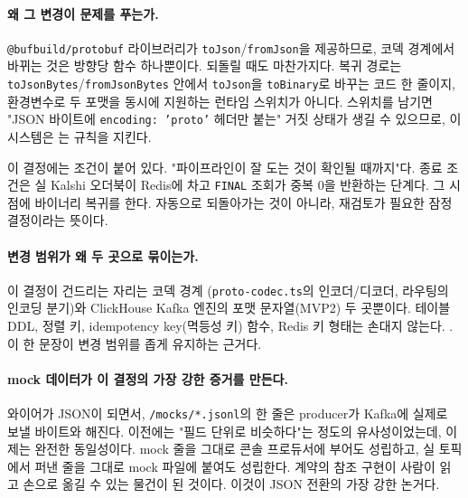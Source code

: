 \paragraph{왜 그 변경이 문제를 푸는가.} \texttt{@bufbuild/protobuf} 라이브러리가
\texttt{toJson}/\texttt{fromJson}을 제공하므로, 코덱 경계에서 바뀌는 것은 방향당
함수 하나뿐이다.  되돌릴 때도 마찬가지다. 복귀 경로는 \texttt{toJsonBytes}/\texttt{fromJsonBytes} 안에서 \texttt{toJson}을
\texttt{toBinary}로 바꾸는 코드 한 줄이지, 환경변수로 두 포맷을 동시에 지원하는
런타임 스위치가 아니다. 스위치를 남기면 "JSON 바이트에 \texttt{encoding: 'proto'}
헤더만 붙는" 거짓 상태가 생길 수 있으므로, 이 시스템은 는 규칙을 지킨다.

\begin{callout}
이 결정에는 조건이 붙어 있다. "파이프라인이 잘 도는 것이 확인될 때까지"다. 종료
조건은 실 Kalshi 오더북이 Redis에 차고 \texttt{FINAL} 조회가 중복 0을 반환하는
단계다. 그 시점에 바이너리 복귀를 한다. 자동으로 되돌아가는 것이
아니라, 재검토가 필요한 잠정 결정이라는 뜻이다.
\end{callout}

\paragraph{변경 범위가 왜 두 곳으로 묶이는가.} 이 결정이 건드리는 자리는 코덱 경계
(\texttt{proto-codec.ts}의 인코더/디코더, 라우팅의 인코딩 분기)와 ClickHouse Kafka
엔진의 포맷 문자열(MVP2) 두 곳뿐이다. 테이블 DDL, 정렬 키, idempotency key(멱등성
키) 함수, Redis 키 형태는 손대지 않는다. . 이 한 문장이 변경 범위를 좁게 유지하는 근거다.

\paragraph{mock 데이터가 이 결정의 가장 강한 증거를 만든다.} 와이어가 JSON이
되면서, \texttt{/mocks/*.jsonl}의 한 줄은 producer가 Kafka에 실제로 보낼 바이트와
해진다. 이전에는 "필드 단위로 비슷하다"는 정도의 유사성이었는데,
이제는 완전한 동일성이다. mock 줄을 그대로 콘솔 프로듀서에 부어도 성립하고, 실
토픽에서 퍼낸 줄을 그대로 mock 파일에 붙여도 성립한다. 계약의 참조 구현이 사람이
읽고 손으로 옮길 수 있는 물건이 된 것이다. 이것이 JSON 전환의 가장 강한 논거다.

